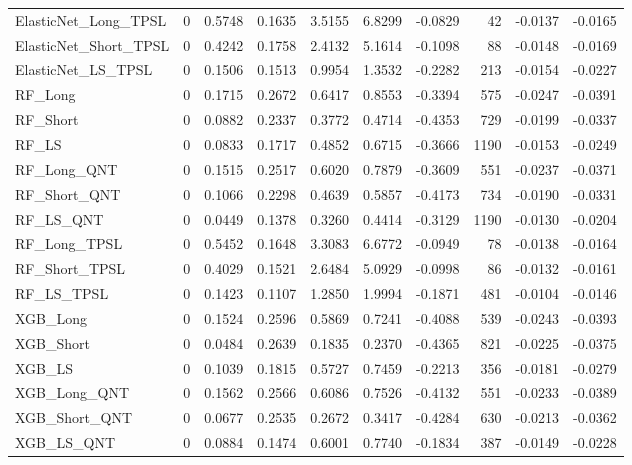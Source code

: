 \begin{tabular}{llrrrrrrrr}
\cline{1-10}
ElasticNet\_Long\_TPSL & 0 & 0.5748 & 0.1635 & 3.5155 & 6.8299 & -0.0829 & 42 & -0.0137 & -0.0165 \\
\cline{1-10}
ElasticNet\_Short\_TPSL & 0 & 0.4242 & 0.1758 & 2.4132 & 5.1614 & -0.1098 & 88 & -0.0148 & -0.0169 \\
\cline{1-10}
ElasticNet\_LS\_TPSL & 0 & 0.1506 & 0.1513 & 0.9954 & 1.3532 & -0.2282 & 213 & -0.0154 & -0.0227 \\
\cline{1-10}
RF\_Long & 0 & 0.1715 & 0.2672 & 0.6417 & 0.8553 & -0.3394 & 575 & -0.0247 & -0.0391 \\
\cline{1-10}
RF\_Short & 0 & 0.0882 & 0.2337 & 0.3772 & 0.4714 & -0.4353 & 729 & -0.0199 & -0.0337 \\
\cline{1-10}
RF\_LS & 0 & 0.0833 & 0.1717 & 0.4852 & 0.6715 & -0.3666 & 1190 & -0.0153 & -0.0249 \\
\cline{1-10}
RF\_Long\_QNT & 0 & 0.1515 & 0.2517 & 0.6020 & 0.7879 & -0.3609 & 551 & -0.0237 & -0.0371 \\
\cline{1-10}
RF\_Short\_QNT & 0 & 0.1066 & 0.2298 & 0.4639 & 0.5857 & -0.4173 & 734 & -0.0190 & -0.0331 \\
\cline{1-10}
RF\_LS\_QNT & 0 & 0.0449 & 0.1378 & 0.3260 & 0.4414 & -0.3129 & 1190 & -0.0130 & -0.0204 \\
\cline{1-10}
RF\_Long\_TPSL & 0 & 0.5452 & 0.1648 & 3.3083 & 6.6772 & -0.0949 & 78 & -0.0138 & -0.0164 \\
\cline{1-10}
RF\_Short\_TPSL & 0 & 0.4029 & 0.1521 & 2.6484 & 5.0929 & -0.0998 & 86 & -0.0132 & -0.0161 \\
\cline{1-10}
RF\_LS\_TPSL & 0 & 0.1423 & 0.1107 & 1.2850 & 1.9994 & -0.1871 & 481 & -0.0104 & -0.0146 \\
\cline{1-10}
XGB\_Long & 0 & 0.1524 & 0.2596 & 0.5869 & 0.7241 & -0.4088 & 539 & -0.0243 & -0.0393 \\
\cline{1-10}
XGB\_Short & 0 & 0.0484 & 0.2639 & 0.1835 & 0.2370 & -0.4365 & 821 & -0.0225 & -0.0375 \\
\cline{1-10}
XGB\_LS & 0 & 0.1039 & 0.1815 & 0.5727 & 0.7459 & -0.2213 & 356 & -0.0181 & -0.0279 \\
\cline{1-10}
XGB\_Long\_QNT & 0 & 0.1562 & 0.2566 & 0.6086 & 0.7526 & -0.4132 & 551 & -0.0233 & -0.0389 \\
\cline{1-10}
XGB\_Short\_QNT & 0 & 0.0677 & 0.2535 & 0.2672 & 0.3417 & -0.4284 & 630 & -0.0213 & -0.0362 \\
\cline{1-10}
XGB\_LS\_QNT & 0 & 0.0884 & 0.1474 & 0.6001 & 0.7740 & -0.1834 & 387 & -0.0149 & -0.0228 \\

\end{tabular}

